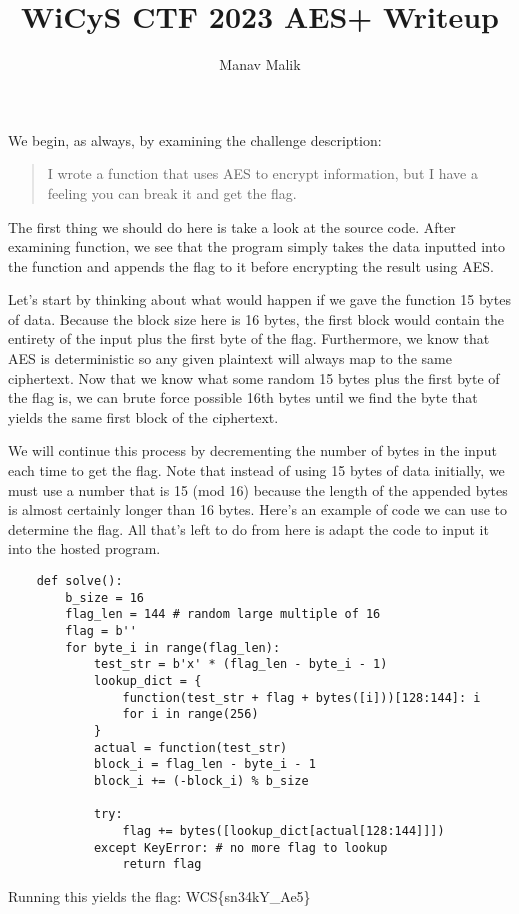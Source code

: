 \documentclass{article}
\title{WiCyS CTF 2023 AES+ Writeup}
\author{Manav Malik}
\date{}
\begin{document}
\maketitle

We begin, as always, by examining the challenge description:

\begin{quote}
    I wrote a function that uses AES to encrypt information, but I have a feeling you can break it and get the flag.
\end{quote}
The first thing we should do here is take a look at the source code. After examining {\sf function}, we see that the program simply takes the data inputted into the function and appends the flag to it before encrypting the result using AES.

Let's start by thinking about what would happen if we gave the function 15 bytes of data. Because the block size here is 16 bytes, the first block would contain the entirety of the input plus the first byte of the flag. Furthermore, we know that AES is deterministic so any given plaintext will always map to the same ciphertext. Now that we know what some random 15 bytes plus the first byte of the flag is, we can brute force possible 16th bytes until we find the byte that yields the same first block of the ciphertext.

We will continue this process by decrementing the number of bytes in the input each time to get the flag. Note that instead of using 15 bytes of data initially, we must use a number that is 15 (mod 16) because the length of the appended bytes is almost certainly longer than 16 bytes.
\newpage
Here's an example of code we can use to determine the flag. All that's left to do from here is adapt the code to input it into the hosted program.

\begin{verbatim}
    def solve():
        b_size = 16
        flag_len = 144 # random large multiple of 16
        flag = b''
        for byte_i in range(flag_len):
            test_str = b'x' * (flag_len - byte_i - 1)
            lookup_dict = {
                function(test_str + flag + bytes([i]))[128:144]: i
                for i in range(256)
            }
            actual = function(test_str)
            block_i = flag_len - byte_i - 1
            block_i += (-block_i) % b_size
    
            try:
                flag += bytes([lookup_dict[actual[128:144]]])
            except KeyError: # no more flag to lookup
                return flag
\end{verbatim}
Running this yields the flag: {\sf WCS\{sn34kY\_Ae5\}}
\end{document}
